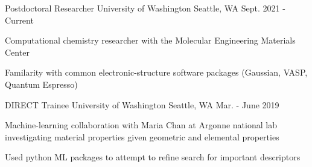 

\begin{cventries}

 \cventry
   {Postdoctoral Researcher} %
   {University of Washington} %
   {Seattle, WA} %
   {Sept. 2021 - Current} %
   {
     \begin{cvitems} %
       \item {Computational chemistry researcher with the Molecular Engineering Materials Center}
       \item {Familarity with common electronic-structure software packages (Gaussian, VASP, Quantum Espresso)}
     \end{cvitems}
   }


 \cventry
   {DIRECT Trainee} %
   {University of Washington} %
   {Seattle, WA} %
   {Mar. - June 2019} %
   {
     \begin{cvitems} %
       \item {Machine-learning collaboration with Maria Chan at Argonne national lab investigating material properties given geometric and elemental properties}
       \item {Used python ML packages to attempt to refine search for important descriptors}
     \end{cvitems}
   }



\end{cventries}
